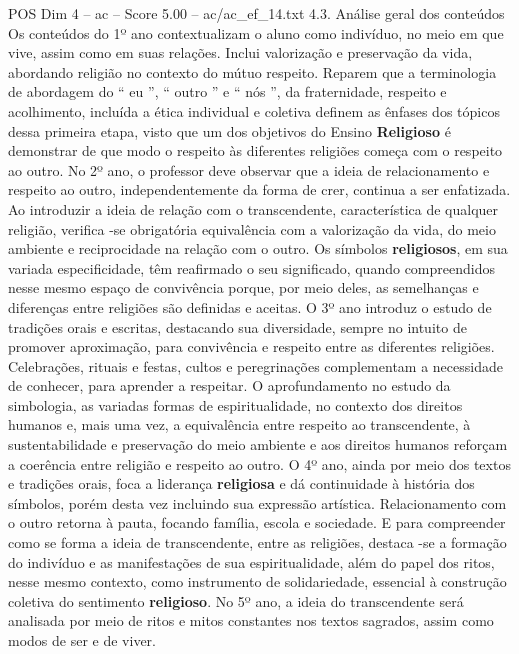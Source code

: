 \begin{textsample}{POS Dim 4 – ac – Score 5.00 – ac/ac\_ef\_14.txt}  \label{ex:f4_pos_247}
4.3.
Análise geral dos conteúdos Os conteúdos do 1º ano contextualizam o aluno como indivíduo, no meio em que vive, assim como em suas relações.
Inclui valorização e preservação da vida, abordando religião no contexto do mútuo respeito.
Reparem que a terminologia de abordagem do “ eu ”, “ outro ” e “ nós ”, da fraternidade, respeito e acolhimento, incluída a ética individual e coletiva definem as ênfases dos tópicos dessa primeira etapa, visto que um dos objetivos do Ensino \textbf{Religioso} é demonstrar de que modo o respeito às diferentes religiões começa com o respeito ao outro.
No 2º ano, o professor deve observar que a ideia de relacionamento e respeito ao outro, independentemente da forma de crer, continua a ser enfatizada.
Ao introduzir a ideia de relação com o transcendente, característica de qualquer religião, verifica -se obrigatória equivalência com a valorização da vida, do meio ambiente e reciprocidade na relação com o outro.
Os símbolos \textbf{religiosos}, em sua variada especificidade, têm reafirmado o seu significado, quando compreendidos nesse mesmo espaço de convivência porque, por meio deles, as semelhanças e diferenças entre religiões são definidas e aceitas.
O 3º ano introduz o estudo de tradições orais e escritas, destacando sua diversidade, sempre no intuito de promover aproximação, para convivência e respeito entre as diferentes religiões.
Celebrações, rituais e festas, cultos e peregrinações complementam a necessidade de conhecer, para aprender a respeitar.
O aprofundamento no estudo da simbologia, as variadas formas de espiritualidade, no contexto dos direitos humanos e, mais uma vez, a equivalência entre respeito ao transcendente, à sustentabilidade e preservação do meio ambiente e aos direitos humanos reforçam a coerência entre religião e respeito ao outro.
O 4º ano, ainda por meio dos textos e tradições orais, foca a liderança \textbf{religiosa} e dá continuidade à história dos símbolos, porém desta vez incluindo sua expressão artística.
Relacionamento com o outro retorna à pauta, focando família, escola e sociedade.
E para compreender como se forma a ideia de transcendente, entre as religiões, destaca -se a formação do indivíduo e as manifestações de sua espiritualidade, além do papel dos ritos, nesse mesmo contexto, como instrumento de solidariedade, essencial à construção coletiva do sentimento \textbf{religioso}.
No 5º ano, a ideia do transcendente será analisada por meio de ritos e mitos constantes nos textos sagrados, assim como modos de ser e de viver.

\end{textsample}
